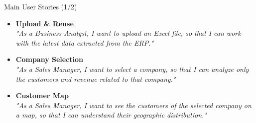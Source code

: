 \begin{frame}{Main User Stories (1/2)}
\begin{itemize}
    \item \textbf{Upload \& Reuse}\\
    \textit{"As a Business Analyst, I want to upload an Excel file, so that I can work with the latest data extracted from the ERP."}
    
    \vspace{0.4cm}
    \item \textbf{Company Selection}\\
    \textit{"As a Sales Manager, I want to select a company, so that I can analyze only the customers and revenue related to that company."}
    
    \vspace{0.4cm}
    \item \textbf{Customer Map}\\
    \textit{"As a Sales Manager, I want to see the customers of the selected company on a map, so that I can understand their geographic distribution."}
\end{itemize}
\end{frame}
